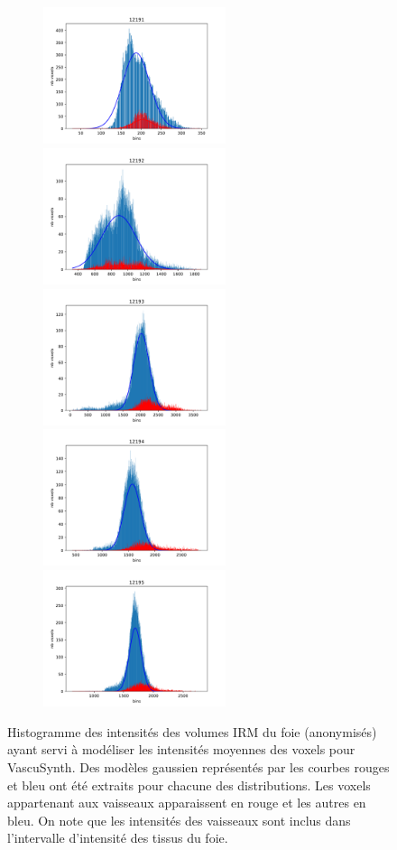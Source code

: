 \begin{figure}[!ht]
  \centering
  \begin{subfigure}{\textwidth}
    \centering
    \includegraphics[height=4cm]{Images/gen_12191.pdf}
    \includegraphics[height=4cm]{Images/gen_12192.pdf}
    \includegraphics[height=4cm]{Images/gen_12193.pdf}
    \includegraphics[height=4cm]{Images/gen_12194.pdf}
    \includegraphics[height=4cm]{Images/gen_12195.pdf}
  \end{subfigure}
  \caption{Histogramme des intensités des volumes IRM du foie (anonymisés) ayant servi à modéliser les intensités moyennes des voxels pour VascuSynth. Des modèles gaussien représentés par les courbes rouges et bleu ont été extraits pour chacune des distributions. Les voxels appartenant aux vaisseaux apparaissent en rouge et les autres en bleu. On note que les intensités des vaisseaux sont inclus dans l'intervalle d'intensité des tissus du foie.}
  \label{fig:Distributions_mri_intensities}
\end{figure}
